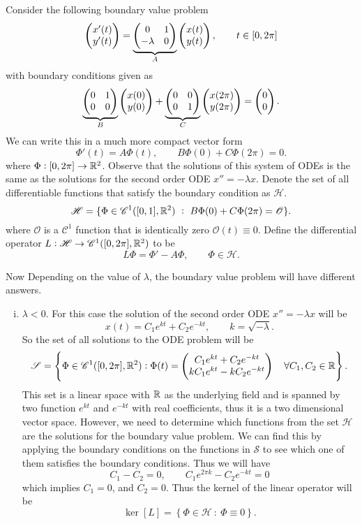 \begin{example}
	Consider the following boundary value problem
	\[ \begin{pmatrix} x'(t) \\ y'(t) \end{pmatrix}=\underbrace{ \begin{pmatrix} 0 & 1 \\ -\lambda & 0 \end{pmatrix}}_{A} \begin{pmatrix} x(t) \\ y(t) \end{pmatrix},\qquad t\in [0,2\pi]\]
	with boundary conditions given as
	\[ \underbrace{\begin{pmatrix} 0 & 1 \\ 0 & 0 \end{pmatrix}}_{B}\begin{pmatrix} x(0) \\ y(0) \end{pmatrix} + \underbrace{\begin{pmatrix} 0 & 0 \\ 0 & 1 \end{pmatrix}}_{C} \begin{pmatrix} x(2\pi) \\ y(2\pi) \end{pmatrix} = \begin{pmatrix} 0 \\ 0 \end{pmatrix}. \]
	We can write this in a much more compact vector form
	\[ \Phi'(t) = A\Phi(t), \qquad B\Phi(0) + C\Phi(2\pi) = 0. \tag{E.2.1}\]
	where $\Phi:[0,2\pi]\to \mathbb{R}^2$. Observe that the solutions of this system of ODEs is the same as the solutions for the second order ODE $x'' = -\lambda x$. Denote the set of all differentiable functions that satisfy the boundary condition as $\mathscr{H}$.
	\[ \mathscr{H} = \{\Phi \in \mathscr{C}^1([0,1],\mathbb{R}^2)\ :\ B\Phi(0) + C\Phi(2\pi) = \mathscr{O} \}. \]
	where $\mathscr{O}$ is a $\mathscr{C}^1$ function that is identically zero $\mathscr{O}(t)\equiv0$. Define the differential operator $L: \mathscr{H} \to \mathscr{C}^1([0,2\pi],\mathbb{R}^2)$ to be
	\[ L \Phi = \Phi' - A \Phi, \qquad \Phi \in \mathscr{H}. \]
	
	 Now Depending on the value of $\lambda$, the boundary value problem will have different answers. 
	\begin{enumerate}[(i)]
		\item $\lambda<0$. For this case the solution of the second order ODE $x'' = -\lambda x$ will be
		\[ x(t) = C_1 e^{kt} + C_2e^{-kt}, \qquad k = \sqrt{-\lambda}. \]
		So the set of all solutions to the ODE problem will be
		\[ \mathscr{S} = \left\{\Phi\in\mathscr{C}^1([0,2\pi],\mathbb{R}^2): \Phi(t)=\begin{pmatrix} C_1 e^{kt} + C_2e^{-kt} \\ kC_1 e^{kt} - kC_2e^{-kt} \end{pmatrix}\quad \forall C_1,C_2 \in \mathbb{R}\right\}.  \]
		This set is a linear space with $\mathbb{R}$ as the underlying field and is spanned by two function $e^{kt}$ and $e^{-kt}$ with real coefficients, thus it is a two dimensional vector space. However, we need to determine which functions from the set $\mathscr{H}$ are the solutions for the boundary value problem. We can find this by applying the boundary conditions on the functions in $\mathscr{S}$ to see which one of them satisfies the boundary conditions. Thus we will have
		\[ C_1 - C_2 = 0, \qquad C_1e^{2\pi k} - C_2e^{-kt} = 0 \]
		which implies $C_1 = 0$, and $C_2= 0$. Thus the kernel of the linear operator will be
		\[ \ker\left[ L \right] = \left\{ \Phi \in \mathscr{H}\ :\ \Phi\equiv 0 \right\}. \]
		

\end{enumerate}
\end{example}
